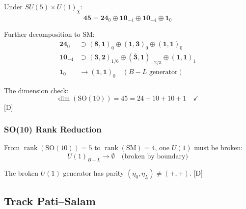 \documentclass[11pt,a4paper]{article}
\newcommand{\tagD}{\textcolor{blue!70!black}{[D]}}
\DeclareMathOperator{\rank}{rank}
\begin{document}
Under $SU(5) \times U(1)_\chi$:
\begin{equation}
\label{eq:so10-adj-decomp}
\mathbf{45} = \mathbf{24}_0 \oplus \mathbf{10}_{-4} \oplus \overline{\mathbf{10}}_{+4} \oplus \mathbf{1}_0
\end{equation}

Further decomposition to SM:
\begin{align}
\label{eq:so10-to-sm-1}
\mathbf{24}_0 &\supset (\mathbf{8},\mathbf{1})_0 \oplus (\mathbf{1},\mathbf{3})_0 \oplus (\mathbf{1},\mathbf{1})_0 \\
\label{eq:so10-to-sm-2}
\mathbf{10}_{-4} &\supset (\mathbf{3},\mathbf{2})_{1/6} \oplus (\bar{\mathbf{3}},\mathbf{1})_{-2/3} \oplus (\mathbf{1},\mathbf{1})_{1} \\
\label{eq:so10-to-sm-3}
\mathbf{1}_0 &\to (\mathbf{1},\mathbf{1})_0 \quad (B-L \text{ generator})
\end{align}

The dimension check:
\begin{equation}
\label{eq:so10-dim-check}
\dim(\text{SO}(10)) = 45 = 24 + 10 + 10 + 1 \quad \checkmark
\end{equation}
\tagD

\subsubsection{SO(10) Rank Reduction}

From $\rank(\text{SO}(10)) = 5$ to $\rank(\text{SM}) = 4$, one $U(1)$ must be broken:
\begin{equation}
\label{eq:so10-rank}
U(1)_{B-L} \to \emptyset \quad \text{(broken by boundary)}
\end{equation}

The broken $U(1)$ generator has parity $(\eta_0, \eta_L) \neq (+,+)$. \tagD

\subsection{Track Pati--Salam}
\end{document}
